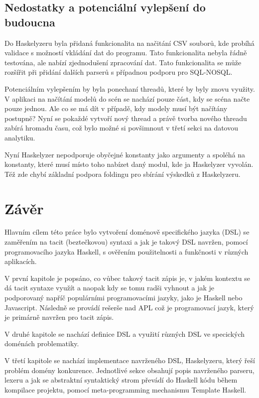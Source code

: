 \documentclass[male,czech]{kithesis}
\begin{document}
\section{Nedostatky a potenciální vylepšení do budoucna}

Do Haskelyzeru byla přidaná funkcionalita na načitání CSV souborů,
kde probíhá validace s možností vkládání dat do programu.
Tato funkcionalita nebyla řádně testována, 
ale nabízí zjednodušení zpracování dat.
Tato funkcionalita se může rozšířit při přidání dalších parserů 
s případnou podporu pro SQL-NOSQL.

Potenciálním vylepšením by byla ponechaní threadů, 
které by byly znovu využity.
V aplikaci na načítání modelů do scén se nachází pouze část,
kdy se scéna načte pouze jednou.
Ale co se má dít v případě, 
kdy modely musí být načítány postupně?
Nyní se pokaždé vytvoří nový thread a 
právě tvorba nového threadu zabírá hromadu času,
což bylo možné si povšimnout v třetí sekci na datovou analytiku.

Nyní Haskelyzer nepodporuje obyčejné konstanty jako argumenty a
spoléhá na konstanty,
které musí místo toho nabízet daný modul, 
kde ja Haskelyzer vyvolán.
Též zde chybí základní podpora foldingu pro sbírání výskedků z Haskelyzeru.

\chapter{Závěr}

Hlavním cílem této práce bylo vytvoření doménově specifického jazyka (DSL) se zaměřením 
na tacit (beztečkovou) syntaxi a 
jak je takový DSL navržen, 
pomocí programovacího jazyka Haskell, 
s ověřením použitelnosti a funkčnosti v různých aplikacích.

V první kapitole je popsáno, 
co vůbec takový tacit zápis je,
v jakém kontextu se dá tacit syntaxe využít a naopak kdy se tomu radši vyhnout a
jak je podporovaný napříč populárními programovacími jazyky,
jako je Haskell nebo Javascript. 
Následně se provádí rešerše nad APL což je programovací jazyk,
který je primárně navržen pro tacit zápis.

V druhé kapitole se nachází definice DSL a
využití různých DSL ve specických doménách problematiky.

V třetí kapitole se nachází implementace navrženého DSL, 
Haskelyzeru, 
který řeší problém domény konkurence.
Jednotlivé sekce obsahují popis navrženého parseru, 
lexeru a 
jak se abstraktní syntaktický strom převádí 
do Haskell kódu během kompilace projektu, 
pomocí meta-programming mechanismu Template Haskell.
\end{document}
